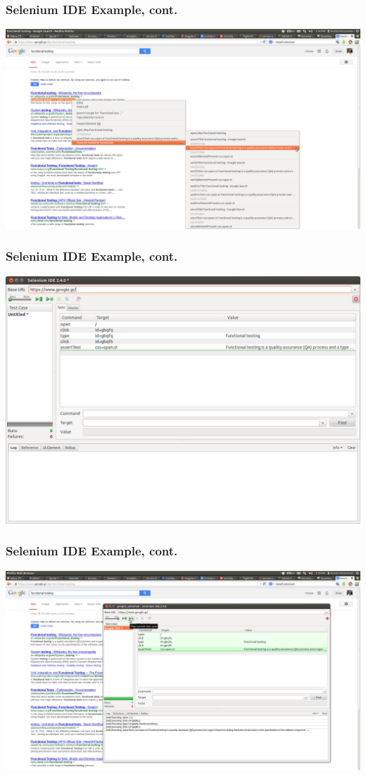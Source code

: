 \documentclass{beamer}
\begin{document}
\begin{frame}[fragile]\frametitle{Selenium IDE Example, cont.} 

  \includegraphics[scale=0.18]{images/selenium_add_assertions.png}
  
\end{frame}


\begin{frame}[fragile]\frametitle{Selenium IDE Example, cont.} 

  \includegraphics[scale=0.28]{images/Selenium_IDE.png}
  
\end{frame}


\begin{frame}[fragile]\frametitle{Selenium IDE Example, cont.} 

  \includegraphics[scale=0.18]{images/selenium_running_test.png}
  
\end{frame}
\end{document}
